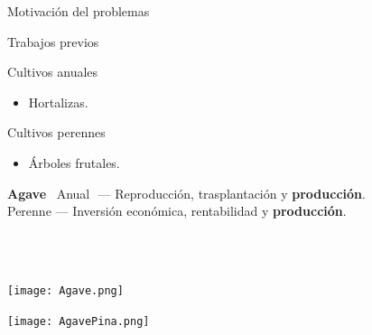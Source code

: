 \documentclass[aspectratio=169]{beamer}
\begin{document}
\begin{frame}{Motivación del problemas}
	\begin{block}{\centering Trabajos previos}
		\begin{minipage}{0.5\textwidth}
			Cultivos anuales
			\begin{itemize}
				\item Hortalizas.
			\end{itemize}
		\end{minipage}%
		\begin{minipage}{0.5\textwidth}
			Cultivos perennes
			\begin{itemize}
				\item Árboles frutales.
			\end{itemize}
		\end{minipage}
	\end{block}
	\centering\begin{minipage}{0.75\textwidth}
	\begin{block}{\bf Agave}
		\,\,\,Anual\,\, --- Reproducción, trasplantación y {\bf producción}.\\
		 Perenne --- Inversión económica, rentabilidad y {\bf producción}. 
	\end{block}
\end{minipage}

\,\\

\phantom{\centering \Large  Simultáneamente, anual y perenne.}\\

\begin{minipage}{0.5\textwidth}
	\vspace{-1.5cm}\raggedright\texttt{[image: Agave.png]}\hfill
\end{minipage}%
\begin{minipage}{0.5\textwidth}
	\vspace{-1cm}\raggedleft\texttt{[image: AgavePina.png]}
\end{minipage}%
\end{frame}
\end{document}
